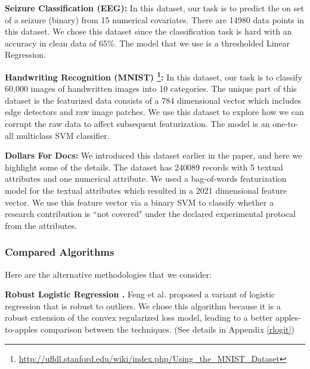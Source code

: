 \noindent\textbf{Seizure Classification (EEG): } In this dataset, our task is to predict the on set of a seizure (binary) from 15 numerical covariates. There are 14980 data points in this dataset. We chose this dataset since the classification task is hard with an accuracy in clean data of 65\%. The model that we use is a thresholded Linear Regression.

\vspace{0.25em}

\noindent\textbf{Handwriting Recognition (MNIST) \footnote{\scriptsize\url{http://ufldl.stanford.edu/wiki/index.php/Using_the_MNIST_Dataset}}: } In this dataset, our task is to classify 60,000 images of handwritten images into 10 categories. The unique part of this dataset is the featurized data consists of a 784 dimensional vector which includes edge detectors and raw image patches. We use this dataset to explore how we can corrupt the raw data to affect subsequent featurization. The model is an one-to-all multiclass SVM classifier. 

\vspace{0.25em}

\noindent\textbf{Dollars For Docs: } We introduced this dataset earlier in the paper, and here we highlight some of the details. The dataset has 240089 records with 5 textual attributes and one numerical attribute.
We used a bag-of-words featurization model for the textual attributes which resulted in a 2021 dimensional feature vector. 
We use this feature vector via a binary SVM to classify whether a research contribution is ``not covered" under the declared experimental protocal from the attributes.

\subsubsection{Compared Algorithms}
\noindent Here are the alternative methodologies that we consider:

\vspace{0.25em}

\noindent\textbf{Robust Logistic Regression \cite{feng2014robust}. } Feng et al. proposed a variant of logistic regression that is robust to outliers. We chose this algorithm because it is a robust extension of the convex regularized loss model, leading to a better apples-to-apples comparison between the techniques. (See details in Appendix \ref{rlogit})  

\vspace{0.25em}

